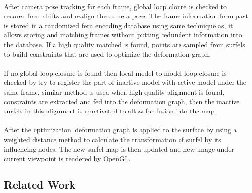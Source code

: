 \documentclass[12pt,twoside]{article}
\begin{document}
\\
After camera pose tracking for each frame, global loop cloure is checked to recover from drifts and realign the camera pose. The frame information from past is stored in a randomized fern encoding database using same technique as\cite{glocker2015real}, it allows storing and matching frames without putting redundent information into the database. If a high quality matched is found, points are sampled from surfels to build constraints that are used to optimize the deformation graph.\\
\\
If no global loop closure is found then local model to model loop closure is checked by try to register the part of inactive model with active model under the same frame, similar method is used when high quality alignment is found, constraints are extracted and fed into  the deformation graph, then the inactive surfels in this alignment is reactivated to allow for fusion into the map.\\
\\
After the optimization, deformation graph is applied to the surface by using a weighted distance method to calculate the transformation of surfel by its influencing nodes. The new surfel map is then updated and new image under current viewpoint is rendered by OpenGL.\\ 




\subsection{Related Work}
\end{document}
